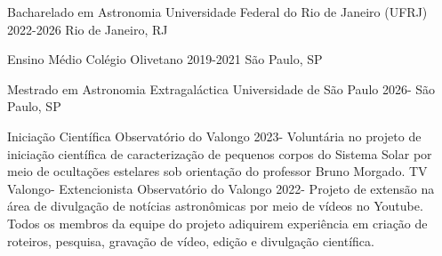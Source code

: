 \documentclass[11pt]{spidercv}
\begin{document}
    





    \begin{MainPart}

    \Experience
        {\ColorHighlight}
		{Bacharelado em Astronomia}
		{Universidade Federal do Rio de Janeiro (UFRJ)}
        {2022-2026}
        {   
            Rio de Janeiro, RJ\\
        
        }
   
    \Experience
        {\ColorHighlight}
		{Ensino Médio}
		{Colégio Olivetano}
        {2019-2021}
        {   
            São Paulo, SP\\

        }

    \Experience
        {\ColorHighlight}
		{Mestrado em Astronomia Extragaláctica}
		{Universidade de São Paulo}
        {2026-\faUndo}
        {   
            São Paulo, SP\\
        }
        \vspace*{0.7cm}

    \Experience
        {\ColorHighlight}
		{Iniciação Científica}
		{Observatório do Valongo}
        {2023-\faUndo}
        {Voluntária no projeto de iniciação científica de caracterização de pequenos corpos do Sistema Solar por meio de ocultações estelares sob orientação do professor Bruno Morgado.}
        \vspace*{0.1cm}
    \Experience
        {\ColorHighlight}
		{TV Valongo- Extencionista}
		{Observatório do Valongo}
        {2022-\faUndo}
        {Projeto de extensão na área de divulgação de notícias astronômicas por meio de vídeos no Youtube. Todos os membros da equipe do projeto adiquirem experiência em criação de roteiros, pesquisa, gravação de vídeo, edição e divulgação científica.}


\end{MainPart}
\end{document}
